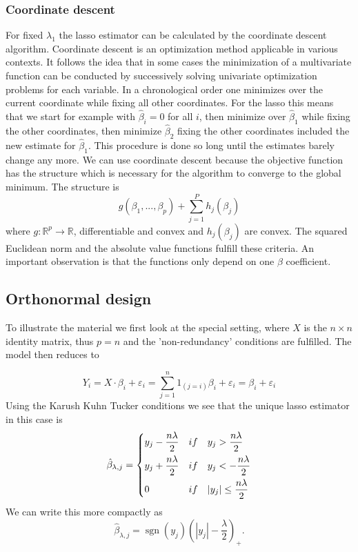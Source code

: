 \documentclass{article}
\theoremstyle{definition}
\DeclareMathOperator*{\sgn}{sgn}
\begin{document}
\subsubsection{Coordinate descent} \label{Sec: Coordinate Lasso}
For fixed $\lambda_1$ the lasso estimator can be calculated by the coordinate descent algorithm.
Coordinate descent is an optimization method applicable in various contexts. It follows the idea that in some cases the minimization of a multivariate function can be conducted by successively solving univariate optimization problems for each variable. In a chronological order one minimizes over the current coordinate while fixing all other coordinates. For the lasso this means that we start for example with $\hat{\beta}_i =0$ for all $i$, then minimize over $\hat{\beta}_1$ while fixing the other coordinates, then minimize $\hat{\beta}_2$ fixing the other coordinates included the new estimate for $\hat{\beta}_1$. This procedure is done so long until the estimates barely change any more.
We can use coordinate descent because the objective function has the structure which is necessary for the algorithm to converge to the global minimum. The structure is
\begin{equation}
g(\beta_1,...,\beta_p)+\sum_{j=1}^Ph_j(\beta_j) \nonumber
\end{equation}
where $g: \mathbb{R}^p \to \mathbb{R}$, differentiable and convex and $h_j(\beta_j)$ are convex.  The squared Euclidean norm and the absolute value functions fulfill these criteria. An important observation is that the functions only depend on one $\beta$ coefficient.
\cite[chapter 5]{sparsity}
 \newline

\subsection{Orthonormal design}

To illustrate the material we first look at the special setting, where $X$ is the $n \times n$ identity matrix, thus $p=n$ and the 'non-redundancy' conditions are fulfilled. The model then reduces to

$$Y_i=X \cdot\beta_i+\varepsilon_i=\sum^n_{j=1}1_{(j=i)}\beta_i+\varepsilon_i = \beta_i + \varepsilon_i$$
%
Using the Karush Kuhn Tucker conditions we see that the unique lasso estimator in this case is
$$\hat\beta_{\lambda,j}= \begin{dcases} y_j-\frac{n\lambda}{2} &if \quad y_j>\frac{n\lambda}{2}\\
            									  y_j+\frac{n\lambda}{2} &if \quad y_j<-\frac{n\lambda}{2}\\
                                                  0						 &if \quad |y_j|\leq \frac{n\lambda}{2}
\end{dcases}$$
We can write this more compactly as 
\begin{equation}
 \hat\beta_{\lambda,j} = \sgn(y_j)(|y_j|-\frac{\lambda}{2})_+.
\end{equation}
\end{document}
